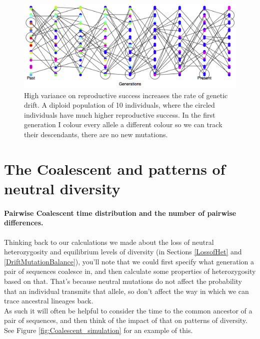\begin{figure}
\begin{center}
\includegraphics[width= \textwidth]{figures/Loss_of_he_col_alleles_varying_RS.png}

\end{center}
\caption{High variance on reproductive success increases the rate of genetic drift. A diploid population of 10 individuals, where the circled
  individuals have much higher reproductive success. In the first generation I colour every allele a different
colour so we can track their descendants, there are no new
  mutations.} \label{fig:LossHet_varying_RS}
\end{figure} 


\section{The Coalescent and patterns of neutral diversity}

\paragraph{Pairwise Coalescent time distribution and the number of
 pairwise differences.}
Thinking back to our calculations we made about the loss of neutral heterozygosity
and equilibrium levels of diversity (in Sections \ref{LossofHet} and \ref{DriftMutationBalance}), you'll note that we could first specify
what generation a pair of sequences coalesce in, and then calculate
some properties of heterozygosity based on that. That's because neutral
mutations do not affect the probability that an individual transmits
that allele, so don't affect the way in which we can trace ancestral lineages
back. \\


As such it will often be helpful to consider the time to the common
ancestor of a pair of sequences, and then think of the impact of that
on patterns of diversity. See Figure \ref{fig:Coalescent_simulation}
for an example of this. 

